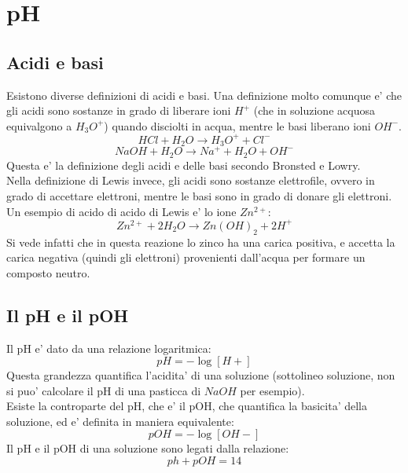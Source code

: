 \documentclass[12pt]{article}
\begin{document}
\section{pH}
\subsection{Acidi e basi}
Esistono diverse definizioni di acidi e basi. Una definizione molto comunque e' che gli acidi sono sostanze in grado di liberare ioni $H^+$ (che in soluzione acquosa equivalgono a $H_3O^+$) quando disciolti in acqua, mentre le basi liberano ioni $OH^-$.
$$
	HCl + H_2O \rightarrow H_3O^+ + Cl^-
$$
$$
	NaOH + H_2O \rightarrow Na^+ + H_2O + OH^-
$$
Questa e' la definizione degli acidi e delle basi secondo Bronsted e Lowry. \\
Nella definizione di Lewis invece, gli acidi sono sostanze elettrofile, ovvero in grado di accettare elettroni, mentre le basi sono in grado di donare gli elettroni. Un esempio di acido di acido di Lewis e' lo ione $Zn^{2+}$:
$$
	Zn^{2+} + 2H_2O \rightarrow Zn(OH)_2 + 2H^+
$$
Si vede infatti che in questa reazione lo zinco ha una carica positiva, e accetta la carica negativa (quindi gli elettroni) provenienti dall'acqua per formare un composto neutro.
\subsection{Il pH e il pOH}
Il pH e' dato da una relazione logaritmica:
$$
	pH = -\log[H+]
$$
Questa grandezza quantifica l'acidita' di una soluzione (sottolineo soluzione, non si puo' calcolare il pH di una pasticca di $NaOH$ per esempio). \\
Esiste la controparte del pH, che e' il pOH, che quantifica la basicita' della soluzione, ed e' definita in maniera equivalente:
$$
	pOH = -\log[OH-]
$$
Il pH e il pOH di una soluzione sono legati dalla relazione:
$$
	ph + pOH = 14
$$
\end{document}
